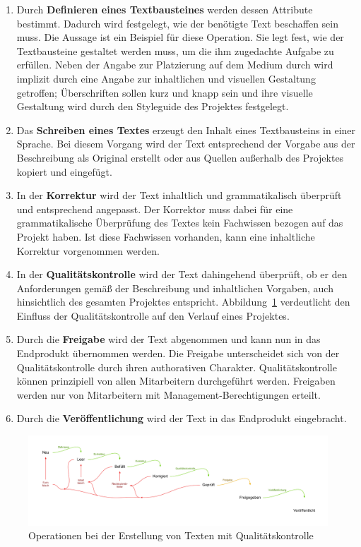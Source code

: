 \begin{enumerate}
\item{Durch \textbf{Definieren eines Textbausteines} werden dessen Attribute bestimmt. Dadurch wird festgelegt, wie der benötigte Text beschaffen sein muss. Die Aussage  ist ein Beispiel für diese Operation. Sie legt fest, wie der Textbausteine gestaltet werden muss, um die ihm zugedachte Aufgabe zu erfüllen. Neben der Angabe zur Platzierung auf dem Medium durch  wird implizit durch  eine Angabe zur inhaltlichen und visuellen Gestaltung getroffen; Überschriften sollen kurz und knapp sein und ihre visuelle Gestaltung wird durch den Styleguide des Projektes festgelegt.}
\item{Das \textbf{Schreiben eines Textes} erzeugt den Inhalt eines Textbausteins in einer Sprache. Bei diesem Vorgang wird der Text entsprechend der Vorgabe aus der Beschreibung als Original erstellt oder aus Quellen außerhalb des Projektes kopiert und eingefügt. }
\item{In der \textbf{Korrektur} wird der Text inhaltlich und grammatikalisch überprüft und entsprechend angepasst. Der Korrektor muss dabei für eine grammatikalische Überprüfung des Textes kein Fachwissen bezogen auf das Projekt haben. Ist diese Fachwissen vorhanden, kann eine inhaltliche Korrektur vorgenommen werden.}
\item{In der \textbf{Qualitätskontrolle} wird der Text dahingehend überprüft, ob er den Anforderungen gemäß der Beschreibung und inhaltlichen Vorgaben, auch hinsichtlich des gesamten Projektes entspricht. Abbildung~\ref{chart:4} verdeutlicht den Einfluss der Qualitätskontrolle auf den Verlauf eines Projektes.}
\item{Durch die \textbf{Freigabe} wird der Text abgenommen und kann nun in das Endprodukt übernommen werden. Die Freigabe unterscheidet sich von der Qualitätskontrolle durch ihren authorativen Charakter. Qualitätskontrolle können prinzipiell von allen Mitarbeitern durchgeführt werden. Freigaben werden nur von Mitarbeitern mit Management-Berechtigungen erteilt.}
\item{Durch die \textbf{Veröffentlichung} wird der Text in das Endprodukt eingebracht.}
\end{enumerate}

\begin{figure}[htb]
\begin{center}
\includegraphics[width=\textwidth]{media/chart-4.pdf}
\end{center}
\caption{Operationen bei der Erstellung von Texten mit Qualitätskontrolle}
\label{chart:4}
\end{figure}

